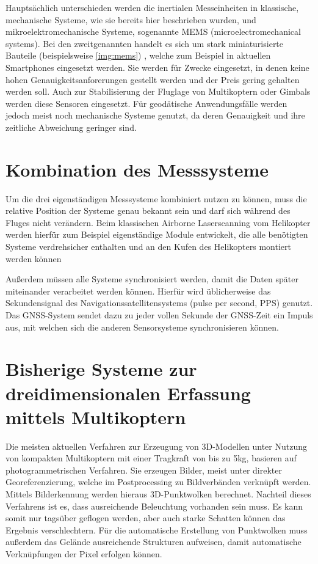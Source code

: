 \documentclass[a4paper,12pt,bibliography=totoc, listof=totoc,titlepage,pointlessnumbers]{scrreprt}
\begin{document}
Hauptsächlich unterschieden werden die inertialen Messeinheiten in klassische, mechanische Systeme, wie sie bereits hier beschrieben wurden, und mikroelektromechanische Systeme, sogenannte MEMS (microelectromechanical systems). Bei den zweitgenannten handelt es sich um stark miniaturisierte Bauteile (beispielsweise \autoref{img:mems}) , welche zum Beispiel in aktuellen Smartphones eingesetzt werden. Sie werden für Zwecke eingesetzt, in denen keine hohen Genauigkeitsanforerungen gestellt werden und der Preis gering gehalten werden soll. Auch zur Stabilisierung der Fluglage von Multikoptern oder Gimbals werden diese Sensoren eingesetzt. Für geodätische Anwendungsfälle werden jedoch meist noch mechanische Systeme genutzt, da deren Genauigkeit und ihre zeitliche Abweichung geringer sind.


\section{Kombination des Messsysteme}
Um die drei eigenständigen Messsysteme kombiniert nutzen zu können, muss die relative Position der Systeme genau bekannt sein und darf sich während des Fluges nicht verändern. Beim klassischen Airborne Laserscanning vom Helikopter werden hierfür zum Beispiel eigenständige Module entwickelt, die alle benötigten Systeme verdrehsicher enthalten und an den Kufen des Helikopters montiert werden können \citep[S. 23f]{beraldin}

Außerdem müssen alle Systeme synchronisiert werden, damit die Daten später miteinander verarbeitet werden können. Hierfür wird üblicherweise das Sekundensignal des Navigationssatellitensystems (pulse per second, PPS) genutzt. Das GNSS-System sendet dazu zu jeder vollen Sekunde der GNSS-Zeit ein Impuls aus, mit welchen sich die anderen Sensorsysteme synchronisieren können. 

\section{Bisherige Systeme zur dreidimensionalen Erfassung mittels Multikoptern}
Die meisten aktuellen Verfahren zur Erzeugung von 3D-Modellen unter Nutzung von kompakten Multikoptern mit einer Tragkraft von bis zu 5kg, basieren auf photogrammetrischen Verfahren. Sie erzeugen Bilder, meist unter direkter Georeferenzierung, welche im Postprocessing zu Bildverbänden verknüpft werden. Mittels Bilderkennung werden hieraus 3D-Punktwolken berechnet. Nachteil dieses Verfahrens ist es, dass ausreichende Beleuchtung vorhanden sein muss. Es kann somit nur tagsüber geflogen werden, aber auch starke Schatten können das Ergebnis verschlechtern. Für die automatische Erstellung von Punktwolken muss außerdem das Gelände ausreichende Strukturen aufweisen, damit automatische Verknüpfungen der Pixel erfolgen können.
\end{document}
